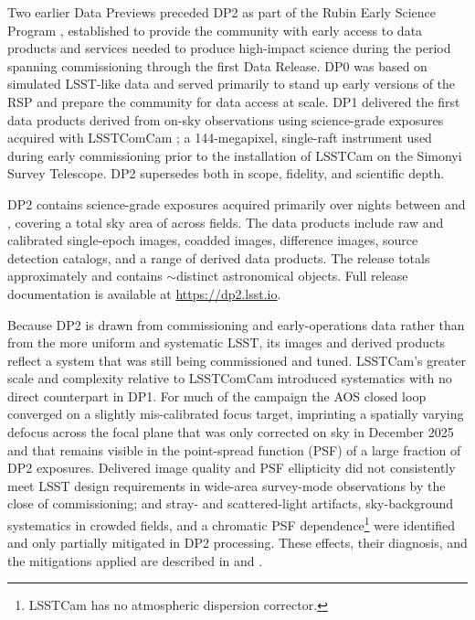 Two earlier Data Previews preceded \gls{DP2} as part of the Rubin Early Science Program \citep[][]{RTN-011}, established to provide the community with early access to data products and services needed to produce high-impact science during the period spanning commissioning through the first Data Release.
\gls{DP0} was based on simulated \gls{LSST}-like data \citep[][]{2021ApJS..253...31L} and served primarily to stand up early versions of the \gls{RSP} and prepare the community for data access at scale.
\gls{DP1} \citep[][]{10.71929/rubin/2570308} delivered the first data products derived from on-sky observations using science-grade exposures acquired with \gls{LSSTComCam} \citep[][]{2022SPIE12184E..0JS,2020SPIE11447E..0LS,2018SPIE10700E..3DH, 10.71929/rubin/2561361}; a 144-megapixel, single-raft instrument used during early commissioning prior to the installation of \gls{LSSTCam} on the Simonyi Survey Telescope.
\gls{DP2} supersedes both in scope, fidelity, and scientific depth.

\gls{DP2} contains \nexposures science-grade exposures acquired primarily over \svcampaignnnights nights between \svcampaignstartdate and \svcampaignenddate, covering a total sky area of \totalarea across \nfields fields.
The data products include raw and calibrated single-\gls{epoch} images, coadded images, difference images, source detection catalogs, and a range of derived data products.
The release totals approximately \edptwosize and contains $\sim$\nobjects distinct astronomical objects.
Full release documentation is available at \url{https://dp2.lsst.io}.

Because \gls{DP2} is drawn from commissioning and early-operations data rather than from the more uniform and  systematic \gls{LSST}, its images and derived products reflect a system that was still being commissioned and tuned.
\gls{LSSTCam}'s greater scale and complexity relative to \gls{LSSTComCam} introduced systematics with no direct counterpart in \gls{DP1}.
For much of the campaign the \gls{AOS} closed loop converged on a slightly mis-calibrated focus target, imprinting a spatially varying defocus across the focal plane that was only corrected on sky in December 2025 and that remains visible in the point-spread function (\gls{PSF}) of a large fraction of \gls{DP2} exposures.
Delivered image quality and PSF ellipticity did not consistently meet \gls{LSST} design requirements in wide-area survey-mode observations by the close of commissioning; and stray- and scattered-light artifacts, sky-\gls{background} systematics in crowded fields, and a chromatic PSF dependence\footnote{\gls{LSSTCam} has no atmospheric dispersion corrector.} were identified and only partially mitigated in \gls{DP2} processing.
These effects, their diagnosis, and the mitigations applied are described in  and .

